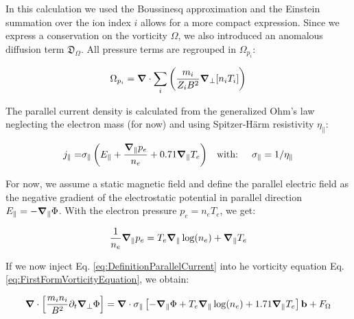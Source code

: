 In this calculation we used the Boussinesq approximation and the Einstein summation over the ion index $i$ allows for a more compact expression. Since we express a conservation on the vorticity $\Omega$, we also introduced an anomalous diffusion term $\mathfrak{D}_\Omega$. All pressure terms are regrouped in $\Omega_{p_i}$:

\begin{equation}
	\Omega_{p_i} = \grad\cdot\sum_{i}\left(\frac{m_i}{Z_i B^2}\grad_\perp[n_i T_i]\right)
\end{equation}


The parallel current density is calculated from the generalized Ohm's law neglecting the electron mass (for now) and using Spitzer-Härm resistivity $\eta_\parallel$:
 
\begin{align} 
 	\label{eq:DefinitionParallelCurrent}
 	j_\parallel =& \sigma_\parallel \left(E_\parallel + \frac{\grad_\parallel p_e}{n_e} + 0.71\grad_\parallel T_e\right) & \text{with: }&& \sigma_\parallel = 1/\eta_\parallel
 \end{align}

For now, we assume a static magnetic field and define the parallel electric field as the negative gradient of the electrostatic potential in parallel direction $E_\parallel=-\grad_\parallel\Phi$. With the electron pressure $p_e=n_eT_e$, we get:  
 
$$\frac{1}{n_e}\grad_\parallel p_e = T_e\grad_\parallel\log(n_e) + \grad_\parallel T_e$$

If we now inject Eq. \ref{eq:DefinitionParallelCurrent} into he vorticity equation Eq. \ref{eq:FirstFormVorticityEquation}, we obtain: 
 
\begin{equation}
	\label{eq:S3X_ElectrostaticVorticityEquation}
	 \grad\cdot\left[\frac{m_i n_i}{ B^2}\partial_t\grad_\perp\Phi\right]  = \grad\cdot\sigma_\parallel \left[-\grad_\parallel\Phi +  T_e\grad_\parallel\log(n_e) + 1.71\grad_\parallel T_e\right]\mathbf{b} + F_\Omega
\end{equation}


